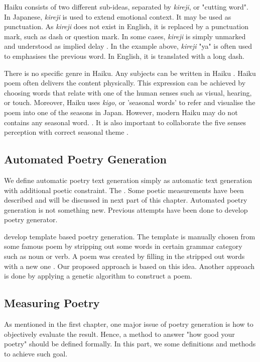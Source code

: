 Haiku consists of two different sub-ideas, separated by \textit{kireji}, or "cutting word". In Japanese, \textit{kireji} is used to extend emotional context. It may be used as punctuation. As \textit{kireji} does not exist in English, it is replaced by a punctuation mark, such as dash or question mark. In some cases, \textit{kireji} is simply unmarked and understood as implied delay \cite{Haiku_kireji}. In the example above, \textit{kireji} "ya" is often used to emphasises the previous word. In English, it is translated with a long dash.


There is no specific genre in Haiku. Any subjects can be written in Haiku \cite{Haiku_JP}. Haiku poem often delivers the content physically. This expression can be achieved by choosing words that relate with one of the human senses such as visual, hearing, or touch. Moreover, Haiku uses \textit{kigo}, or 'seasonal words' to refer and visualise the poem into one of the seasons in Japan. However, modern Haiku may do not contains any seasonal word. \cite{Haiku_JP}. It is also important to collaborate the five senses perception with correct seasonal theme \cite{Haiku_poet}.


\subsection{Automated Poetry Generation}


We define automatic poetry text generation simply as automatic text generation with additional poetic constraint. The . Some poetic measurements have been described and will be discussed in next part of this chapter. Automated poetry generation is not something new. Previous attempts have been done to develop poetry generator. 


\citeauthor{rashelpemuisi} develop template based poetry generation. The template is manually chosen from some famous poem by stripping out some words in certain grammar category such as noun or verb. A poem was created by filling in the stripped out words with a new one \cite{rashelpemuisi}. Our proposed approach is based on this idea. Another approach is done by applying a genetic algorithm to construct a poem\cite{manurung2012using}.


\subsection{Measuring Poetry}


As mentioned in the first chapter, one major issue of poetry generation is how to objectively evaluate the result. Hence, a method to answer "how good your poetry" should be defined formally. In this part, we some definitions and methods to achieve such goal.


